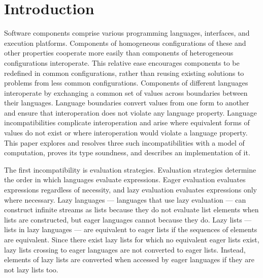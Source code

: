 \chapter{Introduction}

Software components comprise various programming languages, interfaces, and execution platforms.  Components of homogeneous configurations of these and other properties cooperate more easily than components of heterogeneous configurations interoperate.  This relative ease encourages components to be redefined in common configurations, rather than reusing existing solutions to problems from less common configurations.  Components of different languages interoperate by exchanging a common set of values across boundaries between their languages.  Language boundaries convert values from one form to another and ensure that interoperation does not violate any language property.  Language incompatibilities complicate interoperation and arise where equivalent forms of values do not exist or where interoperation would violate a language property.  This paper explores and resolves three such incompatibilities with a model of computation, proves its type soundness, and describes an implementation of it.

The first incompatibility is evaluation strategies.  Evaluation strategies determine the order in which languages evaluate expressions.  Eager evaluation evaluates expressions regardless of necessity, and lazy evaluation evaluates expressions only where necessary.  Lazy languages --- languages that use lazy evaluation --- can construct infinite streams as lists because they do not evaluate list elements when lists are constructed, but eager languages cannot because they do.  Lazy lists --- lists in lazy languages --- are equivalent to eager lists if the sequences of elements are equivalent.  Since there exist lazy lists for which no equivalent eager lists exist, lazy lists crossing to eager languages are not converted to eager lists.  Instead, elements of lazy lists are converted when accessed by eager languages if they are not lazy lists too.

